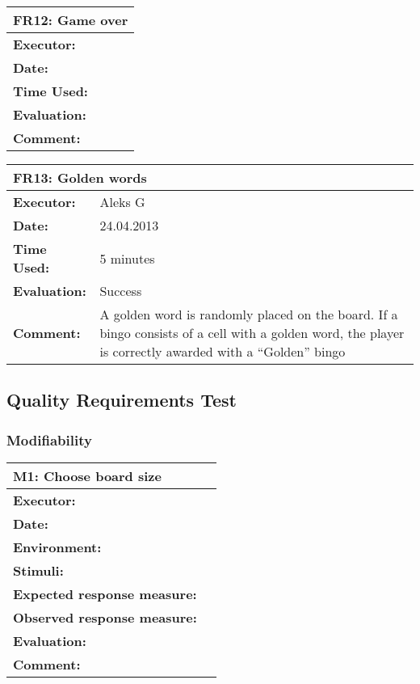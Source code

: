 \begin{tabular}{|m{}||m{}|}
\hline
\multicolumn{2}{|l|}{FR12: Game over} \\ \hline
\textbf{Executor:} & \\ \hline
\textbf{Date:} & \\ \hline
\textbf{Time Used:} & \\ \hline
\textbf{Evaluation:} & \\ \hline
\textbf{Comment:} & \\ \hline
\end{tabular}


\begin{tabular}{|m{}||m{}|}
\hline
\multicolumn{2}{|l|}{FR13: Golden words} \\ \hline
\textbf{Executor:} & Aleks G\\ \hline
\textbf{Date:} & 24.04.2013\\ \hline
\textbf{Time Used:} & 5 minutes\\ \hline
\textbf{Evaluation:} & Success\\ \hline
\textbf{Comment:} & A golden word is randomly placed on the board. If a bingo consists of a cell with a golden word, the player is correctly awarded with a ``Golden'' bingo\\ \hline
\end{tabular}



\subsection{Quality Requirements Test}

\subsubsection{Modifiability}

\begin{tabular}{|m{}||m{}|}
\hline
\multicolumn{2}{|l|}{M1: Choose board size} \\ \hline
\textbf{Executor:} & \\ \hline
\textbf{Date:} & \\ \hline
\textbf{Environment:} & \\ \hline
\textbf{Stimuli:} & \\ \hline
\textbf{Expected response measure:} & \\ \hline
\textbf{Observed response measure:} & \\ \hline
\textbf{Evaluation:} & \\ \hline
\textbf{Comment:} & \\ \hline
\end{tabular}

